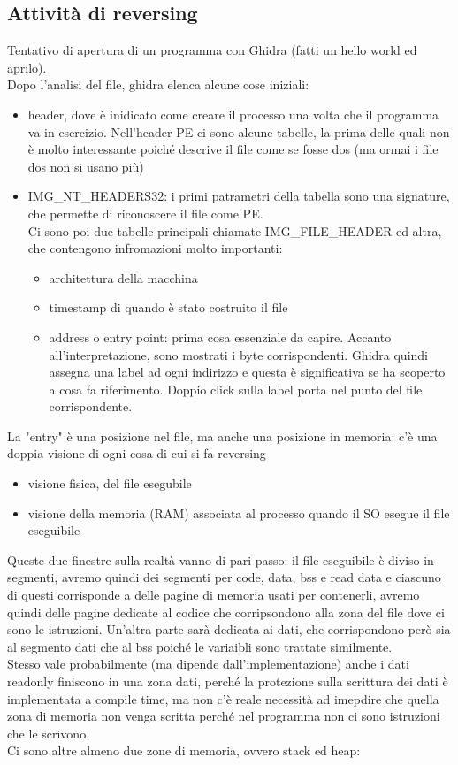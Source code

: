 \documentclass[12pt, oneside]{extbook}
\begin{document}
\subsection{Attività di reversing}
Tentativo di apertura di un programma con Ghidra (fatti un hello world  ed aprilo).\\ Dopo l'analisi del file, ghidra elenca alcune cose iniziali:
\begin{itemize}
\item header, dove è inidicato come creare il processo una volta che il programma va in esercizio. Nell'header PE ci sono alcune tabelle, la prima delle quali non è molto interessante poiché descrive il file come se fosse dos (ma ormai i file dos non si usano più)
\item IMG\_NT\_HEADERS32: i primi patrametri della tabella sono una signature, che permette di riconoscere il file come PE.\\ Ci sono poi due tabelle principali chiamate IMG\_FILE\_HEADER ed altra, che contengono infromazioni molto importanti:
\begin{itemize}
\item architettura della macchina
\item timestamp di quando è stato costruito il file
\item address o entry point: prima cosa essenziale da capire. Accanto all'interpretazione, sono  mostrati i byte corrispondenti. Ghidra quindi assegna una label ad ogni indirizzo e questa è significativa se ha scoperto a cosa fa riferimento. Doppio click sulla label porta nel punto del file corrispondente.
\end{itemize}
\end{itemize}
La "entry" è una posizione nel file, ma anche una posizione in memoria: c'è una doppia visione di ogni cosa di cui si fa reversing
\begin{itemize}
\item visione fisica, del file esegubile
\item visione della memoria (RAM) associata al processo quando il SO esegue il file eseguibile
\end{itemize}
Queste due finestre sulla realtà vanno di pari passo: il file eseguibile è diviso in segmenti, avremo quindi dei segmenti per code, data, bss e read data e ciascuno di questi corrisponde a delle pagine di memoria usati per contenerli, avremo quindi delle pagine dedicate al codice che corripsondono alla zona del file dove ci sono le istruzioni. Un'altra parte sarà dedicata ai dati, che corrispondono però sia al segmento dati che al bss poiché le variaibli sono trattate similmente.\\ Stesso vale probabilmente (ma dipende dall'implementazione) anche i dati readonly finiscono in una zona dati, perché la protezione sulla scrittura dei dati è implementata a compile time, ma non c'è reale necessità ad imepdire che quella zona di memoria non venga scritta perché nel programma non ci sono istruzioni che le scrivono.\\ Ci sono altre almeno due zone di memoria, ovvero stack ed heap:
\end{document}
